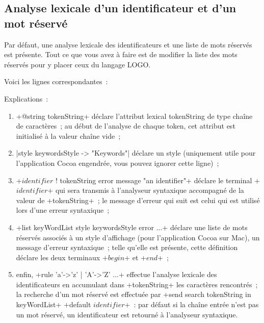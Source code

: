\subsection{Analyse lexicale d'un identificateur et d'un mot réservé}

Par défaut, une analyse lexicale des identificateurs et une liste de mots réservés est présente. Tout ce que vous avez à faire est de modifier la liste des mots réservés pour y placer ceux du langage LOGO.

Voici les lignes correspondantes~:


Explications~:
\begin{enumerate}
  \item \ggst+@string tokenString+ déclare l’attribut lexical tokenString de type chaîne de caractères~; au début de l’analyse de chaque token, cet attribut est initialisé à la valeur chaîne vide~;
  \item \ggst|style keywordsStyle -> "Keywords"| déclare un style (uniquement utile pour l’application Cocoa engendrée, vous pouvez ignorer cette ligne)~;
  \item \ggst+$identifier$ ! tokenString error message "an identifier"+ déclare le terminal \ggst+$identifier$+ qui sera transmis à l’analyseur syntaxique accompagné de la valeur de \ggst+tokenString+~; le message d’erreur qui suit est celui qui est utilisé lors d’une erreur syntaxique~;
  \item \ggst+list keyWordList style keywordsStyle error ...+ déclare une liste de mots réservés associés à un style d’affichage (pour l’application Cocoa sur Mac), un message d’erreur syntaxique~; telle qu’elle est présente, cette définition déclare les deux terminaux \ggst+$begin$+ et \ggst+$end$+~;
  \item enfin, \ggst+rule 'a'->'z' | 'A'->'Z' ...+ effectue l’analyse lexicale des identificateurs en accumulant dans \ggst+tokenString+ les caractères rencontrés~; la recherche d'un mot réservé est effectuée par \ggst+send search tokenString in keyWordList+ \ggst+default $identifier$+~: par défaut si la chaîne entrée n'est pas un mot réservé, un identificateur est retourné à l’analyseur syntaxique.
\end{enumerate}

